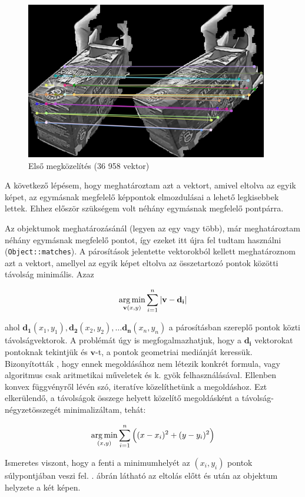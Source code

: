 \begin{figure}[tbh]
\centering
\includegraphics[width=300pt]{figures/vis_bad_0.png}
\caption{Első megközelítés (36 958 vektor) \label{fig:bad0}}
\end{figure}

A következő lépésem, hogy meghatároztam azt a vektort, amivel eltolva az egyik képet, az egymásnak megfelelő képpontok elmozdulásai a lehető legkisebbek lettek. Ehhez először szükségem volt néhány egymásnak megfelelő pontpárra.

Az objektumok meghatározásánál (legyen az egy vagy több), már meghatároztam néhány egymásnak megfelelő pontot, így ezeket itt újra fel tudtam használni (\texttt{Object::matches}). A párosítások jelentette vektorokból kellett meghatároznom azt a vektort, amellyel az egyik képet eltolva az összetartozó pontok közötti távolság minimális. Azaz

\[\operatorname*{arg\,min}_{\mathbf{v}(x, y)} \sum_{i=1}^{n} |\mathbf{v} - \mathbf{d_i}|\]

ahol $\mathbf{d_1}(x_1, y_1), \mathbf{d_2}(x_2, y_2), \ldots \mathbf{d_n}(x_n, y_n)$ a párosításban szereplő pontok közti távolságvektorok. A problémát úgy is megfogalmazhatjuk, hogy a $\mathbf{d_i}$ vektorokat pontoknak tekintjük és $\mathbf{v}$-t, a pontok geometriai mediánját keressük. Bizonyították \cite{Bajaj198699}, hogy ennek megoldásához nem létezik konkrét formula, vagy algoritmus csak aritmetikai műveletek és k. gyök felhasználásával. Ellenben konvex függvényről lévén szó, iteratíve közelíthetünk a megoldáshoz. Ezt elkerülendő, a távolságok összege helyett közelítő megoldásként a távolság-négyzetösszegét minimalizáltam, tehát:

\[\operatorname*{arg\,min}_{(x, y)} \sum_{i=1}^{n} \Big((x-x_i)^2 + (y-y_i)^2\Big)\]

Ismeretes viszont, hogy a fenti a minimumhelyét az $(x_i, y_i)$ pontok súlypontjában veszi fel. . ábrán látható az eltolás előtt és után az objektum helyzete a két képen.

